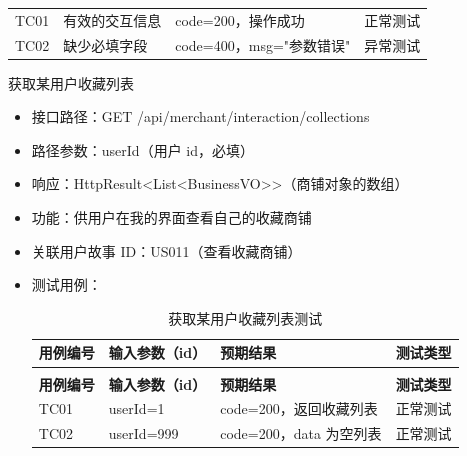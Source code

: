 \begin{levellist}
\begin{levellist}
\begin{itemize}
\begin{longtable}{>{\centering\arraybackslash}m{1.7cm} >{\centering\arraybackslash}m{3cm} >{\centering\arraybackslash}m{6.3cm} >{\centering\arraybackslash}m{2cm}}
                      \bottomrule
                      \endfoot

                      TC01          & 有效的交互信息           & code=200，操作成功       & 正常测试          \\
                      TC02          & 缺少必填字段            & code=400，msg="参数错误" & 异常测试          \\
                  \end{longtable}
        \end{itemize}

        \item 获取某用户收藏列表
        \begin{itemize}
            \item 接口路径：GET /api/merchant/interaction/collections
            \item 路径参数：userId（用户 id，必填）
            \item 响应：HttpResult<List<BusinessVO>>（商铺对象的数组）
            \item 功能：供用户在我的界面查看自己的收藏商铺
            \item 关联用户故事 ID：US011（查看收藏商铺）
            \item 测试用例：
                  \begin{longtable}{>{\centering\arraybackslash}m{2cm} >{\centering\arraybackslash}m{4cm} >{\centering\arraybackslash}m{5cm} >{\centering\arraybackslash}m{2cm}}

                      \caption{获取某用户收藏列表测试} \label{tab:training}                             \\

                      \toprule
                      \textbf{用例编号} & \textbf{输入参数（id）} & \textbf{预期结果}      & \textbf{测试类型} \\
                      \midrule
                      \endfirsthead

                      \multicolumn{4}{c}{{\tablename\ \thetable{} 续表}}                       \\
                      \toprule
                      \textbf{用例编号} & \textbf{输入参数（id）} & \textbf{预期结果}      & \textbf{测试类型} \\
                      \midrule
                      \endhead

                      \bottomrule
                      \endfoot

                      TC01          & userId=1          & code=200，返回收藏列表    & 正常测试          \\
                      TC02          & userId=999        & code=200，data 为空列表 & 正常测试          \\
                  \end{longtable}
        \end{itemize}


\end{levellist}
\end{levellist}
